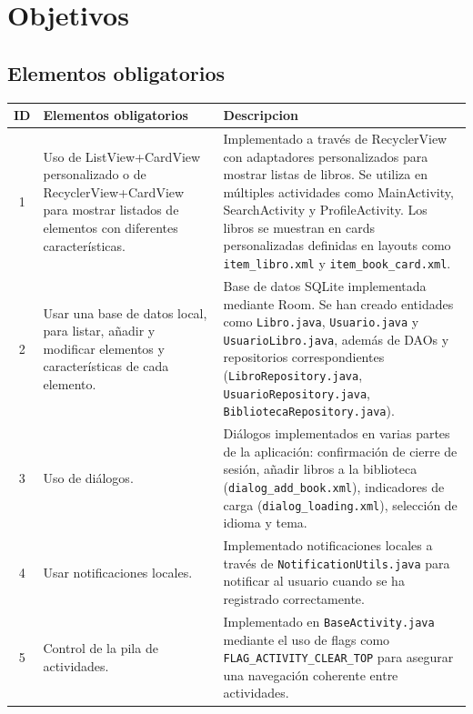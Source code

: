 \documentclass[a4paper,12pt]{report}
\begin{document}
  \chapter{Objetivos}
    \section{Elementos obligatorios}
      \begin{longtable}{|c|p{}|p{}|}
        \hline
        \textbf{ID} & \textbf{Elementos obligatorios} & \textbf{Descripcion} \\ \hline
        1 & Uso de ListView+CardView personalizado o de RecyclerView+CardView para mostrar listados de elementos con diferentes características. & Implementado a través de RecyclerView con adaptadores personalizados para mostrar listas de libros. Se utiliza en múltiples actividades como MainActivity, SearchActivity y ProfileActivity. Los libros se muestran en cards personalizadas definidas en layouts como \texttt{item\_libro.xml} y \texttt{item\_book\_card.xml}. \\ \hline
        2 & Usar una base de datos local, para listar, añadir y modificar elementos y características de cada elemento. & Base de datos SQLite implementada mediante Room. Se han creado entidades como \texttt{Libro.java}, \texttt{Usuario.java} y \texttt{UsuarioLibro.java}, además de DAOs y repositorios correspondientes (\texttt{LibroRepository.java}, \texttt{UsuarioRepository.java}, \texttt{BibliotecaRepository.java}). \\ \hline
        3 & Uso de diálogos. & Diálogos implementados en varias partes de la aplicación: confirmación de cierre de sesión, añadir libros a la biblioteca (\texttt{dialog\_add\_book.xml}), indicadores de carga (\texttt{dialog\_loading.xml}), selección de idioma y tema. \\ \hline
        4 & Usar notificaciones locales. & Implementado notificaciones locales a través de \texttt{NotificationUtils.java} para notificar al usuario cuando se ha registrado correctamente. \\ \hline
        5 & Control de la pila de actividades. & Implementado en \texttt{BaseActivity.java} mediante el uso de flags como \texttt{FLAG\_ACTIVITY\_CLEAR\_TOP} para asegurar una navegación coherente entre actividades. \\ \hline
      \end{longtable}
\end{document}
